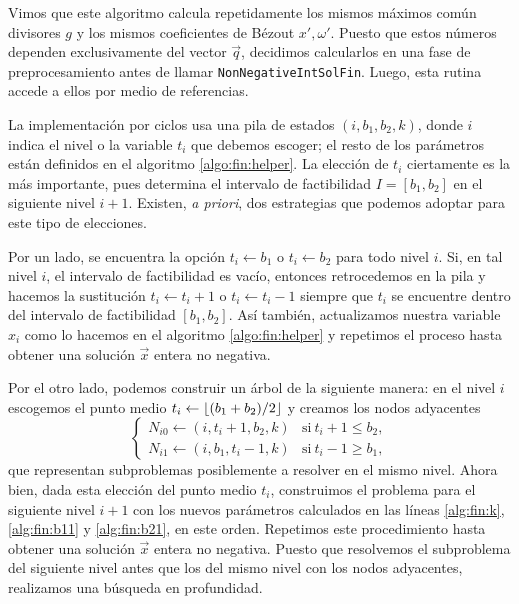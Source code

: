 Vimos que este algoritmo calcula repetidamente los mismos máximos común divisores $g$ y los mismos
coeficientes de Bézout $x', \omega'$. Puesto que estos números dependen exclusivamente del vector
$\vec{q}$, decidimos calcularlos en una fase de preprocesamiento antes de llamar
\texttt{NonNegativeIntSolFin}. Luego, esta rutina accede a ellos por medio de referencias.

La implementación por ciclos usa una pila de estados $(i, b_1, b_2, k)$, donde $i$ indica el nivel o
la variable $t_i$ que debemos escoger; el resto de los parámetros están definidos en el algoritmo
\ref{algo:fin:helper}. La elección de $t_i$ ciertamente es la más importante, pues determina el
intervalo de factibilidad $I = [b_1, b_2]$ en el siguiente nivel $i + 1$. Existen, \textit{a
priori}, dos estrategias que podemos adoptar para este tipo de elecciones.

Por un lado, se encuentra la opción $t_i \leftarrow b_1$ o $t_i \leftarrow b_2$ para todo nivel
$i$. Si, en tal nivel $i$, el intervalo de factibilidad es vacío, entonces retrocedemos
en la pila y hacemos la sustitución $t_i \leftarrow t_i + 1$ o $t_i \leftarrow t_i - 1$ siempre que
$t_i$ se encuentre dentro del intervalo de factibilidad $[b_1, b_2]$. Así también, actualizamos nuestra
variable $x_i$ como lo hacemos en el algoritmo \ref{algo:fin:helper} y repetimos el proceso hasta
obtener una solución $\vec{x}$ entera no negativa.

Por el otro lado, podemos construir un árbol de la siguiente manera: en el nivel $i$
escogemos el punto medio $t_i \leftarrow \left\lfloor (b_1 + b_2)/2 \right\rfloor$ y creamos los nodos adyacentes
\begin{equation}
	\label{exp:subp}
	\begin{cases}
		N_{i0} \leftarrow (i, t_i + 1, b_2, k) & \text{si}~t_i + 1 \leq b_2, \\
		N_{i1} \leftarrow (i, b_1, t_i - 1, k) & \text{si}~t_i - 1 \geq b_1,
	\end{cases}
\end{equation}
que representan subproblemas posiblemente a resolver en el mismo nivel. Ahora bien, dada esta
elección del punto medio $t_i$, construimos el problema para el siguiente nivel $i + 1$ con los
nuevos parámetros calculados en las líneas \ref{alg:fin:k}, \ref{alg:fin:b11} y \ref{alg:fin:b21},
en este orden. Repetimos este procedimiento hasta obtener una solución $\vec{x}$ entera no negativa.
Puesto que resolvemos el subproblema del siguiente nivel antes que los del mismo nivel con los nodos
adyacentes, realizamos una búsqueda en profundidad.

